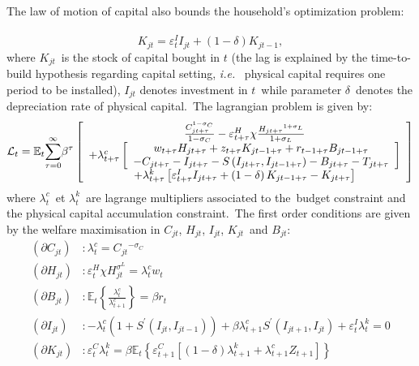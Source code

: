 \documentclass[a4paper,12pt]{article}%
\begin{document}
The law of motion of capital also bounds the household's optimization problem:
\ \
\begin{equation}
K_{jt}=\varepsilon_{t}^{I}I_{jt}+\left(  1-\delta\right)  K_{jt-1},
\label{eq hh investment}%
\end{equation}
where $K_{jt}$\ is the stock of capital bought in $t$ (the lag is explained by
the time-to-build hypothesis regarding capital setting, \textit{i.e.}%
\ physical capital requires one period to be installed), $I_{jt}$ denotes
investment in $t$\ while parameter $\delta$\ denotes the depreciation rate of
physical capital.\ The lagrangian problem is given by:
\[
\mathcal{L}_{t}=\mathbb{E}_{t}%
{\displaystyle\sum\limits_{\tau=0}^{\infty}}
\beta^{\tau}\left[
\begin{array}
[c]{c}%
\frac{C_{jt+\tau}^{1-\sigma_{C}}}{1-\sigma_{C}}-\varepsilon_{t+\tau}^{H}%
\chi\frac{H_{jt+\tau}{}^{1+\sigma_{L}}}{1+\sigma_{L}}\\
+\lambda_{t+\tau}^{c}\left[
\begin{array}
[c]{c}%
w_{t+\tau}H_{jt+\tau}+z_{t+\tau}K_{jt-1+\tau}+r_{t-1+\tau}B_{jt-1+\tau}\\
-C_{jt+\tau}-I_{jt+\tau}-S\left(  I_{jt+\tau},I_{jt-1+\tau}\right)
-B_{jt+\tau}-T_{jt+\tau}%
\end{array}
\right] \\
+\lambda_{t+\tau}^{k}\left[  \varepsilon_{t+\tau}^{I}I_{jt+\tau}+\left(
1-\delta\right)  K_{jt-1+\tau}-K_{jt+\tau}\right]
\end{array}
\right]
\]
where $\lambda_{t}^{c}$\ et $\lambda_{t}^{k}$\ are lagrange multipliers
associated to the\ budget constraint and the physical capital accumulation
constraint.\ The first order conditions are given by the welfare maximisation
in $C_{jt}$, $H_{jt}$, $I_{jt}$, $K_{jt}$\ and $B_{jt}$:%
\begin{align*}
\left(  \partial C_{jt}\right)   &  :\lambda_{t}^{c}=C_{jt}{}^{-\sigma_{C}}\\
\left(  \partial H_{jt}\right)   &  :\varepsilon_{t}^{H}\chi H_{jt}%
^{\sigma^{L}}=\lambda_{t}^{c}w_{t}\\
\left(  \partial B_{jt}\right)   &  :\mathbb{E}_{t}\left\{  \frac{\lambda
_{t}^{c}}{\lambda_{t+1}^{c}}\right\}  =\beta r_{t}\\
\left(  \partial I_{jt}\right)   &  :-\lambda_{t}^{c}\left(  1+S^{\prime
}\left(  I_{jt},I_{jt-1}\right)  \right)  +\beta\lambda_{t+1}^{c}S^{\prime
}\left(  I_{jt+1},I_{jt}\right)  +\varepsilon_{t}^{I}\lambda_{t}^{k}=0\\
\left(  \partial K_{jt}\right)   &  :\varepsilon_{t}^{C}\lambda_{t}^{k}%
=\beta\mathbb{E}_{t}\left\{  \varepsilon_{t+1}^{C}\left[  \overset{}{\left(
1-\delta\right)  }\lambda_{t+1}^{k}+\lambda_{t+1}^{c}Z_{t+1}\right]  \right\}
\end{align*}
\end{document}
